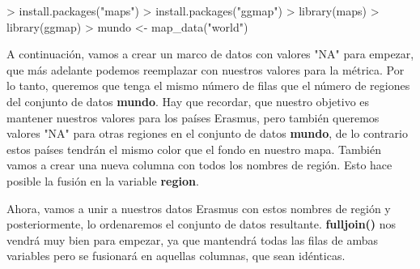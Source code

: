 \documentclass [a4paper] {article}
\begin{document}
\begin{Schunk}
\begin{Sinput}
> install.packages("maps")
> install.packages("ggmap")
> library(maps)
> library(ggmap)
> mundo <- map_data("world")
\end{Sinput}
\end{Schunk}

A continuación, vamos a crear un marco de datos con valores "NA" para empezar, que más adelante
podemos reemplazar con nuestros valores para la métrica. Por lo tanto, queremos que tenga el 
mismo número de filas que el número de regiones del conjunto de datos \textbf{mundo}. Hay que
recordar, que nuestro objetivo es mantener nuestros valores para los países Erasmus, pero
también queremos valores "NA" para otras regiones en el conjunto de datos \textbf{mundo}, de
lo contrario estos países tendrán el mismo color que el fondo en nuestro mapa. También vamos
a crear una nueva columna con todos los nombres de región. Esto hace posible la fusión en la variable
\textbf{region}.

\begin{Schunk}
\end{Schunk}

Ahora, vamos a unir a nuestros datos Erasmus con estos nombres de región y posteriormente, lo
ordenaremos el conjunto de datos resultante. \textbf{fulljoin()} nos vendrá muy bien para empezar,
ya que mantendrá todas las filas de ambas variables pero se fusionará en aquellas columnas,
que sean idénticas.
\end{document}
